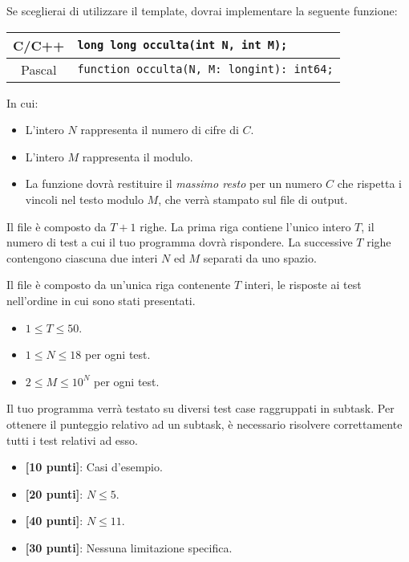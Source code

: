 Se sceglierai di utilizzare il template, dovrai implementare la seguente funzione:
\begin{center}\begin{tabularx}{\textwidth}{|c|X|}
\hline
C/C++  & \verb|long long occulta(int N, int M);|\\
\hline
Pascal & \verb|function occulta(N, M: longint): int64;|\\
\hline
\end{tabularx}\end{center}
In cui:
\begin{itemize}[nolistsep]
  \item L'intero $N$ rappresenta il numero di cifre di $C$.
  \item L'intero $M$ rappresenta il modulo.
  \item La funzione dovrà restituire il \emph{massimo resto} per un numero $C$ che rispetta i vincoli nel testo modulo $M$, che verrà stampato sul file di output.
\end{itemize}

\InputFile
Il file  è composto da $T+1$ righe. La prima riga contiene l'unico intero $T$, il numero di test a cui il tuo programma dovr\`a rispondere. La successive $T$ righe contengono ciascuna due interi $N$ ed $M$ separati da uno spazio.

\OutputFile
Il file \outputfile{} è composto da un'unica riga contenente $T$ interi, le risposte ai test nell'ordine in cui sono stati presentati.

\pagebreak
\Constraints
\begin{itemize}[nolistsep, itemsep=2mm]
	\item $1 \le T \le 50$.
	\item $1 \le N \le 18$ per ogni test.
	\item $2 \le M \le 10^N$ per ogni test.
\end{itemize}

\Scoring
Il tuo programma verrà testato su diversi test case raggruppati in subtask.
Per ottenere il punteggio relativo ad un subtask, è necessario risolvere
correttamente tutti i test relativi ad esso.

\begin{itemize}[nolistsep,itemsep=2mm]
  \item \textbf{ [10 punti]}: Casi d'esempio.
  \item \textbf{ [20 punti]}: $N \leq 5$.
  \item \textbf{ [40 punti]}: $N \leq 11$.
  \item \textbf{ [30 punti]}: Nessuna limitazione specifica.
\end{itemize}

